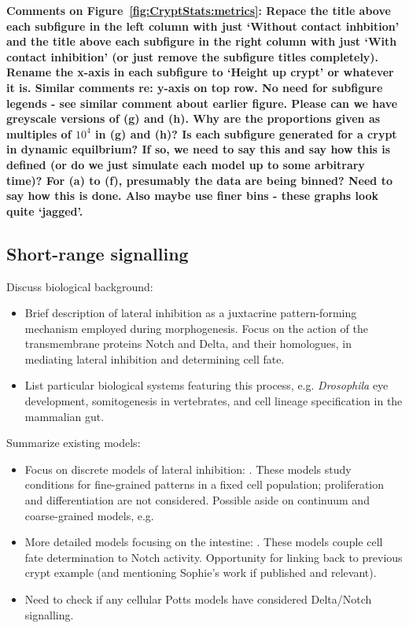 \documentclass{article}
\newcommand{\highlight}[1]{{\color{red} \bf{#1}}}
\begin{document}
\highlight{Comments on Figure~\ref{fig:CryptStats:metrics}: 
Repace the title above each subfigure in the left column with just `Without contact inhbition' and the title above each subfigure in the right column with just `With contact inhibition' (or just remove the subfigure titles completely). 
Rename the x-axis in each subfigure to `Height up crypt' or whatever it is. Similar comments re: y-axis on top row. 
No need for subfigure legends - see similar comment about earlier figure. 
Please can we have greyscale versions of (g) and (h). 
Why are the proportions given as multiples of $10^4$ in (g) and (h)? 
Is each subfigure generated for a crypt in dynamic equilbrium? 
If so, we need to say this and say how this is defined (or do we just simulate each model up to some arbitrary time)? 
For (a) to (f), presumably the data are being binned? Need to say how this is done. 
Also maybe use finer bins - these graphs look quite `jagged'.
}

\subsection{Short-range signalling} \label{sec:juxtacrine}

Discuss biological background:
\begin{itemize}
\item Brief description of lateral inhibition as a juxtacrine pattern-forming mechanism employed during morphogenesis. Focus on the action of the transmembrane proteins Notch and Delta, and their homologues, in mediating lateral inhibition and determining cell fate.
\item List particular biological systems featuring this process, e.g. {\it Drosophila} eye development, somitogenesis in vertebrates, and cell lineage specification in the mammalian gut.
\end{itemize}

\noindent Summarize existing models:
\begin{itemize}
\item Focus on discrete models of lateral inhibition: \citet{Collier1996Pattern, Owen1998Mathematical, Wearing2001Nonlinear, Webb2004Oscillations}. These models study conditions for fine-grained patterns in a fixed cell population; proliferation and differentiation are not considered. Possible aside on continuum and coarse-grained models, e.g. \citet{ODea2011Continuum}
\item More detailed models focusing on the intestine: \citet{Buske2011Comprehensive, Pin2012Modelling}. These models couple cell fate determination to Notch activity. Opportunity for linking back to previous crypt example (and mentioning Sophie's work if published and relevant).
\item Need to check if any cellular Potts models have considered Delta/Notch signalling.
\end{itemize}
\end{document}
